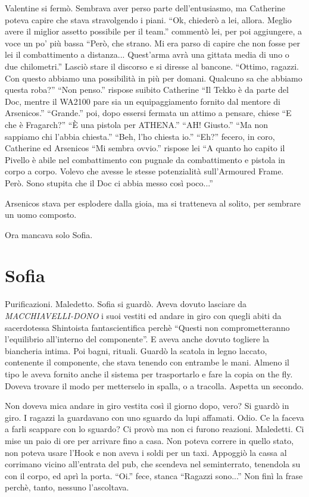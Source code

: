     Valentine si fermò. Sembrava aver perso parte dell'entusiasmo, ma Catherine poteva capire che stava stravolgendo i
    piani. ``Ok, chiederò a lei, allora. Meglio avere il miglior assetto possibile per il team.'' commentò lei, per poi
    aggiungere, a voce un po' più bassa ``Però, che strano. Mi era parso di capire che non fosse per lei il
    combattimento a distanza... Quest'arma avrà una gittata media di uno o due chilometri.'' Lasciò stare il discorso e
    si diresse al bancone. ``Ottimo, ragazzi. Con questo abbiamo una possibilità in più per domani. Qualcuno sa che
    abbiamo questa roba?'' ``Non penso.'' rispose suibito Catherine ``Il Tekko è da parte del Doc, mentre il WA2100 pare
    sia un equipaggiamento fornito dal mentore di Arsenicos.'' ``Grande.'' poi, dopo essersi fermata un attimo a
    pensare, chiese ``E che è Fragarch?'' ``È una pistola per ATHENA.'' ``AH! Giusto.'' ``Ma non sappiamo chi l'abbia
    chiesta.'' ``Beh, l'ho chiesta io.'' ``Eh?'' fecero, in coro, Catherine ed Arsenicos ``Mi sembra ovvio.'' rispose
    lei ``A quanto ho capito il Pivello è abile nel combattimento con pugnale da combattimento e pistola in corpo a
    corpo. Volevo che avesse le stesse potenzialità sull'Armoured Frame. Però. Sono stupita che il Doc ci abbia messo
    così poco...''

    Arsenicos stava per esplodere dalla gioia, ma si tratteneva al solito, per sembrare un uomo composto.

    Ora mancava solo Sofia.

  \section*{Sofia}

    Purificazioni. Maledetto. Sofia si guardò. Aveva dovuto lasciare da \emph{MACCHIAVELLI-DONO} i suoi vestiti ed
    andare in giro con quegli abiti da sacerdotessa Shintoista fantascientifica perchè ``Questi non comprometteranno
    l'equilibrio all'interno del componente''. E aveva anche dovuto togliere la biancheria intima. Poi bagni, rituali.
    Guardò la scatola in legno laccato, contenente il componente, che stava tenendo con entrambe le mani. Almeno il tipo
    le aveva fornito anche il sistema per trasportarlo e fare la copia on the fly. Doveva trovare il modo per metterselo
    in spalla, o a tracolla. Aspetta un secondo.

    Non doveva mica andare in giro vestita così il giorno dopo, vero? Si guardò in giro. I ragazzi la guardavano con uno
    sguardo da lupi affamati. Odio. Ce la faceva a farli scappare con lo sguardo? Ci provò ma non ci furono reazioni.
    Maledetti. Ci mise un paio di ore per arrivare fino a casa. Non poteva correre in quello stato, non poteva usare
    l'Hook e non aveva i soldi per un taxi. Appoggiò la cassa al corrimano vicino all'entrata del pub, che scendeva nel
    seminterrato, tenendola su con il corpo, ed aprì la porta. ``Oi.'' fece, stanca ``Ragazzi sono...'' Non finì la
    frase perchè, tanto, nessuno l'ascoltava.

